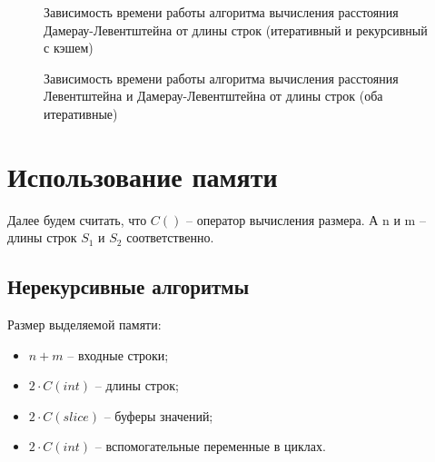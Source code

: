 \begin{figure}[h!]
	\centering
	\captionsetup{justification=centering}
	\caption{Зависимость времени работы алгоритма вычисления расстояния Дамерау-Левентштейна от длины строк (итеративный и рекурсивный с кэшем)}
	\label{plt:iter-rec}
\end{figure}
\clearpage

\begin{figure}[h!]
	\centering
	\captionsetup{justification=centering}
	\caption{Зависимость времени работы алгоритма вычисления расстояния Левентштейна и Дамерау-Левентштейна от длины строк (оба итеративные)}
	\label{plt:l-dl}
\end{figure}

\section{Использование памяти}

Далее будем считать, что $C()$ -- оператор вычисления размера.
А n и m -- длины строк $S_1$ и $S_2$ соответственно.

\subsection{Нерекурсивные алгоритмы}

Размер выделяемой памяти:
\begin{itemize}
	\item $n + m$ -- входные строки;
	\item $2 \cdot C(int)$ -- длины строк;
	\item $2 \cdot C(slice)$ -- буферы значений;
	\item $2 \cdot C(int) $ -- вспомогательные переменные в циклах.
\end{itemize}

